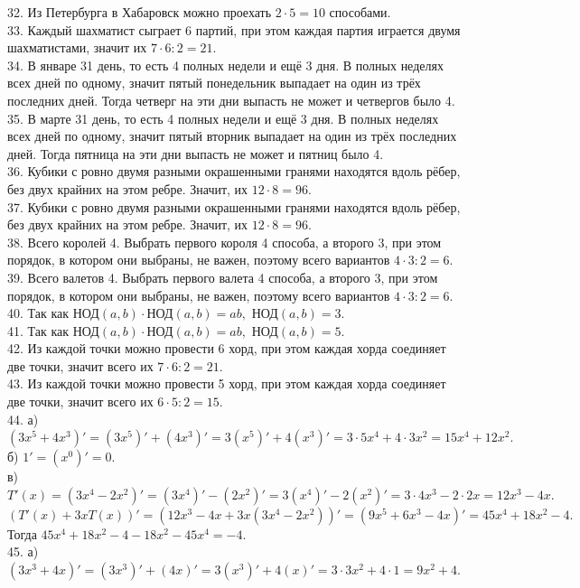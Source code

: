 \documentclass[12pt]{article}
\begin{document}
32. Из Петербурга в Хабаровск можно проехать $2\cdot5=10$ способами.\\
33. Каждый шахматист сыграет 6 партий, при этом каждая партия играется двумя шахматистами, значит их $7\cdot6:2=21.$\\
34. В январе 31 день, то есть 4 полных недели и ещё 3 дня. В полных неделях всех дней по одному, значит пятый понедельник выпадает на один из трёх последних дней. Тогда четверг на эти дни выпасть не может и четвергов было 4.\\
35. В марте 31 день, то есть 4 полных недели и ещё 3 дня. В полных неделях всех дней по одному, значит пятый вторник выпадает на один из трёх последних дней. Тогда пятница на эти дни выпасть не может и пятниц было 4.\\
36. Кубики с ровно двумя разными окрашенными гранями находятся вдоль рёбер, без двух крайних на этом ребре. Значит, их $12\cdot8=96.$\\
37. Кубики с ровно двумя разными окрашенными гранями находятся вдоль рёбер, без двух крайних на этом ребре. Значит, их $12\cdot8=96.$\\
38. Всего королей 4. Выбрать первого короля 4 способа, а второго 3, при этом порядок, в котором они выбраны, не важен, поэтому всего вариантов $4\cdot3:2=6.$\\
39. Всего валетов 4. Выбрать первого валета 4 способа, а второго 3, при этом порядок, в котором они выбраны, не важен, поэтому всего вариантов $4\cdot3:2=6.$\\
40. Так как НОД$(a,b)\cdot$НОД$(a,b)=ab,$ НОД$(a,b)=3.$\\
41. Так как НОД$(a,b)\cdot$НОД$(a,b)=ab,$ НОД$(a,b)=5.$\\
42. Из каждой точки можно провести 6 хорд, при этом каждая хорда соединяет две точки, значит всего их $7\cdot6:2=21.$\\
43. Из каждой точки можно провести 5 хорд, при этом каждая хорда соединяет две точки, значит всего их $6\cdot5:2=15.$\\
44. а) $(3x^5+4x^3)'=(3x^5)'+(4x^3)'=3(x^5)'+4(x^3)'=3\cdot5x^4+4\cdot3x^2=15x^4+12x^2.$\\
б) $1'=(x^0)'=0.$\\
в) $T'(x)=(3x^4-2x^2)'=(3x^4)'-(2x^2)'=3(x^4)'-2(x^2)'=3\cdot4x^3-2\cdot2x=12x^3-4x.$\\
$(T'(x)+3xT(x))'=(12x^3-4x+3x(3x^4-2x^2))'=(9x^5+6x^3-4x)'=45x^4+18x^2-4.$ Тогда $45x^4+18x^2-4-18x^2-45x^4=-4.$\\
45. а) $(3x^3+4x)'=(3x^3)'+(4x)'=3(x^3)'+4(x)'=3\cdot3x^2+4\cdot 1=9x^2+4.$\\
\end{document}
